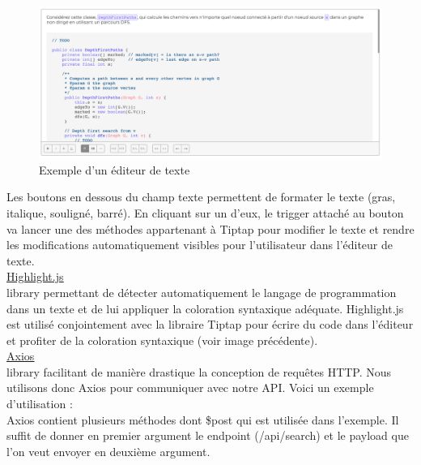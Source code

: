 \begin{figure}[H]
    \includegraphics[width=\textwidth,height=0.35\textheight,keepaspectratio]{images/libraries/tiptap.png}
    \centering
    \caption[Tiptap : Exemple d'utilisation]{Exemple d'un éditeur de texte}
\end{figure}

Les boutons en dessous du champ texte permettent de formater le texte (gras, italique, souligné, barré). En cliquant sur un d'eux, le trigger attaché au bouton va lancer une des méthodes appartenant à Tiptap pour modifier le texte et rendre les modifications automatiquement visibles pour l'utilisateur dans l'éditeur de texte.\\

\noindent\underline{\href{https://highlightjs.org}{Highlight.js}}\\

\Gls{library} permettant de détecter automatiquement le langage de programmation dans un texte et de lui appliquer la coloration syntaxique adéquate. Highlight.js est utilisé conjointement avec la libraire Tiptap pour écrire du code dans l'éditeur et profiter de la coloration syntaxique (voir image précédente).\\

\noindent\underline{\href{https://axios.nuxtjs.org/}{Axios}}\\

\Gls{library} facilitant de manière drastique la conception de requêtes HTTP. Nous utilisons donc Axios pour communiquer avec notre API. Voici un exemple d'utilisation : \\



Axios contient plusieurs méthodes dont \$post qui est utilisée dans l'exemple. Il suffit de donner en premier argument le endpoint (/api/search) et le payload que l'on veut envoyer en deuxième argument.\\

